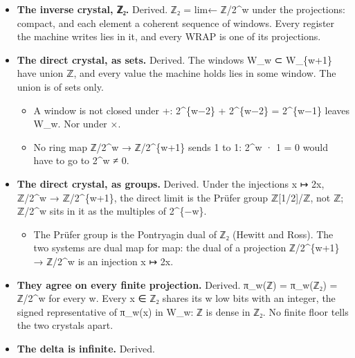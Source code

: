 \begin{itemize}
\item \textbf{The inverse crystal, ℤ₂.} Derived. ℤ₂ = lim← ℤ/2\textasciicircum{}w under the projections: compact, and each element a coherent sequence of windows. Every register the machine writes lies in it, and every WRAP is one of its projections.
\item \textbf{The direct crystal, as sets.} Derived. The windows W\_\allowbreak{}w ⊂ W\_\allowbreak{}\{w+1\} have union ℤ, and every value the machine holds lies in some window. The union is of sets only.

\begin{itemize}
\item A window is not closed under +: 2\textasciicircum{}\{w−2\} + 2\textasciicircum{}\{w−2\} = 2\textasciicircum{}\{w−1\} leaves W\_\allowbreak{}w. Nor under ×.
\item No ring map ℤ/2\textasciicircum{}w → ℤ/2\textasciicircum{}\{w+1\} sends 1 to 1: 2\textasciicircum{}w · 1 = 0 would have to go to 2\textasciicircum{}w ≠ 0.
\end{itemize}
\item \textbf{The direct crystal, as groups.} Derived. Under the injections x ↦ 2x, ℤ/2\textasciicircum{}w → ℤ/2\textasciicircum{}\{w+1\}, the direct limit is the Prüfer group ℤ[1/2]/ℤ, not ℤ; ℤ/2\textasciicircum{}w sits in it as the multiples of 2\textasciicircum{}\{−w\}.

\begin{itemize}
\item The Prüfer group is the Pontryagin dual of ℤ₂ (Hewitt and Ross). The two systems are dual map for map: the dual of a projection ℤ/2\textasciicircum{}\{w+1\} → ℤ/2\textasciicircum{}w is an injection x ↦ 2x.
\end{itemize}
\item \textbf{They agree on every finite projection.} Derived. π\_\allowbreak{}w(ℤ) = π\_\allowbreak{}w(ℤ₂) = ℤ/2\textasciicircum{}w for every w. Every x ∈ ℤ₂ shares its w low bits with an integer, the signed representative of π\_\allowbreak{}w(x) in W\_\allowbreak{}w: ℤ is dense in ℤ₂. No finite floor tells the two crystals apart.
\item \textbf{The delta is infinite.} Derived.


\end{itemize}
